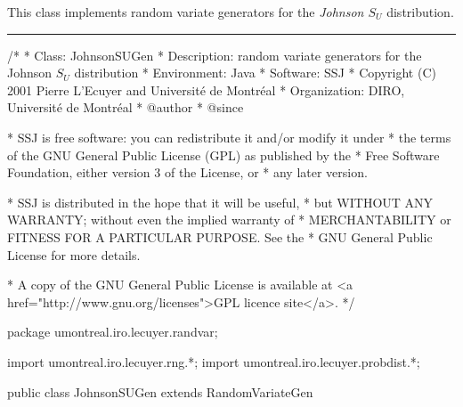 
This class implements random variate generators for the 
{\em Johnson $S_U$\/} distribution. 


\bigskip\hrule

\begin{code}
\begin{hide}
/*
 * Class:        JohnsonSUGen
 * Description:  random variate generators for the Johnson $S_U$ distribution
 * Environment:  Java
 * Software:     SSJ 
 * Copyright (C) 2001  Pierre L'Ecuyer and Université de Montréal
 * Organization: DIRO, Université de Montréal
 * @author       
 * @since

 * SSJ is free software: you can redistribute it and/or modify it under
 * the terms of the GNU General Public License (GPL) as published by the
 * Free Software Foundation, either version 3 of the License, or
 * any later version.

 * SSJ is distributed in the hope that it will be useful,
 * but WITHOUT ANY WARRANTY; without even the implied warranty of
 * MERCHANTABILITY or FITNESS FOR A PARTICULAR PURPOSE.  See the
 * GNU General Public License for more details.

 * A copy of the GNU General Public License is available at
   <a href="http://www.gnu.org/licenses">GPL licence site</a>.
 */
\end{hide}
package umontreal.iro.lecuyer.randvar;\begin{hide}
import umontreal.iro.lecuyer.rng.*;
import umontreal.iro.lecuyer.probdist.*;
\end{hide}

public class JohnsonSUGen extends RandomVariateGen \begin{hide} {
   private double gamma;
   private double delta;
   private double xi;
   private double lambda; 

\end{hide}\end{code}

